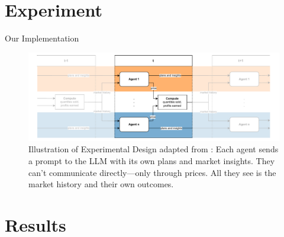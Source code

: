 \documentclass[10pt, aspectratio=169]{beamer}
\begin{document}

\section{Experiment}

\begin{frame}[fragile]{Our Implementation}
    \begin{figure}[htpb!]
      \centering
      \includegraphics[width=1\linewidth]{latex/imgs/illustration_diagram_experiment.pdf}
        \caption{Illustration of Experimental Design adapted from \textcite[p. 9]{fish_algorithmic_2025}: Each agent sends a prompt to the LLM with its own plans and market insights. They can't communicate directly—only through prices. All they see is the market history and their own outcomes.}
        \label{fig:experimental_design}
    \end{figure}
\end{frame}




\section{Results}
\end{document}
